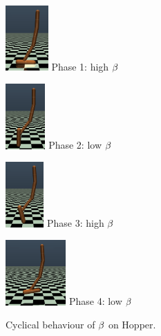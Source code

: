 \begin{figure}[h]
\centering
    \centering
    \begin{minipage}[b]{0.23\linewidth}
    \centering
    \includegraphics[width=\textwidth,height=2.5cm]{fig/phase_0.png}
    Phase 1: high $\beta$
    \label{fig:phase_0}
    \end{minipage}
    \hspace{0.05cm}
    \begin{minipage}[b]{0.23\linewidth}
    \centering
    \includegraphics[width=\textwidth,height=2.5cm]{fig/phase_1.png}
    Phase 2: low $\beta$
    \label{fig:phase_1}
    \end{minipage}
    \hspace{0.02cm}
    \begin{minipage}[b]{0.23\linewidth}
    \centering
    \includegraphics[width=\textwidth,height=2.5cm]{fig/phase_2.png}
    Phase 3: high $\beta$
    \label{fig:phase_2}
    \end{minipage}
    \hspace{0.02cm}
    \begin{minipage}[b]{0.23\linewidth}
    \centering
    \includegraphics[width=\textwidth,height=2.5cm]{fig/phase_3.png}
     Phase 4: low $\beta$
    \label{fig:phase_3}
    \end{minipage}
    \hspace{0.02cm}
    \caption[Qualitative visualization of the emphasis function]{Cyclical behaviour of $\beta$ on Hopper.}
    \label{fig:visual_hopper}
\end{figure}
